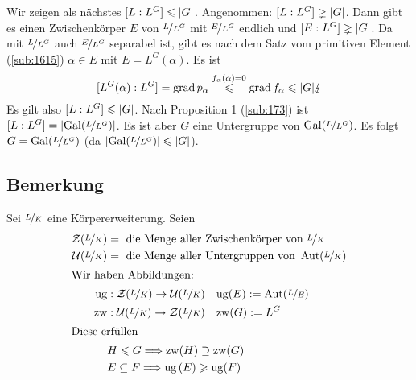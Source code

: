 Wir zeigen als nächstes $[L:L^G] \le \abs*{G} $. Angenommen: $[L:L^G] \gneq \abs*{G} $. Dann gibt es einen Zwischenkörper $E$ von $\nicefrac{L}{L^G}$ mit $\nicefrac{E}{L^G}$
endlich und $[E:L^G] \gneq \abs*{G} $. Da mit $\nicefrac{L}{L^G}$ auch $\nicefrac{E}{L^G}$ separabel ist, gibt es nach dem Satz vom primitiven Element (\ref{sub:1615}) 
$\alpha \in E$ mit $E=L^G(\alpha)$. Es ist 
\[
	[L^G(\alpha): L^G]= \grad p_\alpha \stackrel{f_\alpha(\alpha)=0}{\le} \grad f_\alpha \le \abs*{G} \lightning 
\]
Es gilt also $[L:L^G] \le \abs*{G} $. Nach Proposition 1 (\ref{sub:173}) ist $[L:L^G]= \abs*{\Gal(\nicefrac{L}{L^G})}$. Es ist aber $G$ eine Untergruppe von $\Gal(\nicefrac{L}{L^G})$. Es folgt $G=\Gal(\nicefrac{L}{L^G})$ (da $\abs*{\Gal(\nicefrac{L}{L^G})} \le \abs*{G}  $). \bewende

\subsection[Bemerkung zur Übersetzung zwischen Zwischenkörpern und Untergruppen von $\Aut(\nicefrac{L}{K})$]{Bemerkung} %
\label{sub:177}
Sei $\nicefrac{L}{K}$ eine Körpererweiterung. Seien 
\begin{align*}
	\mathcal{Z}(\nicefrac{L}{K}) &= \text{ die Menge aller Zwischenkörper von } \nicefrac{L}{K} \\
	\mathcal{U}(\nicefrac{L}{K}) &= \text{ die Menge aller Untergruppen von } \Aut(\nicefrac{L}{K}) \\
	\intertext{Wir haben Abbildungen:}
	\mathrm{ug} &: \mathcal{Z}(\nicefrac{L}{K}) \to \mathcal{U}(\nicefrac{L}{K}) \quad \mathrm{ug}(E) := \Aut(\nicefrac{L}{E}) \\
	\mathrm{zw} &: \mathcal{U}(\nicefrac{L}{K}) \to \mathcal{Z}(\nicefrac{L}{K}) \quad \mathrm{zw}(G) := L^G \\
	\intertext{Diese erfüllen}
	&H \le G \Longrightarrow \mathrm{zw}(H) \supseteq \mathrm{zw}(G) \\
	&E \subseteq F \Longrightarrow \mathrm{ug}\,(E) \ge \mathrm{ug}(F)
\end{align*}

